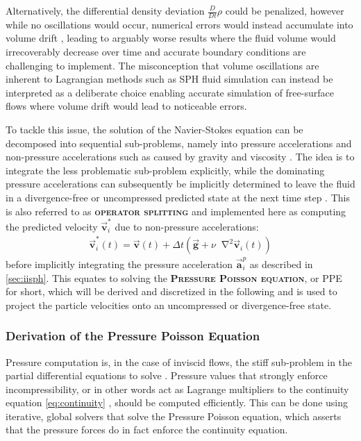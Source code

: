 \documentclass[oneside, a4paper]{book}
\newcommand\emphasis[1]{{\scshape\bfseries#1}}
\newcommand*\Laplace{\mathop{}\!\mathbin\nabla^2}
\newcommand\vek[1]{\vec{\bm{#1}}}
\newcommand\br[1]{\left(#1\right)}
\begin{document}
    Alternatively, the differential density deviation $\frac{D}{Dt}\rho$ could be penalized, however while no oscillations would occur, numerical errors would instead accumulate into volume drift \autocite{tutorial2019}, leading to arguably worse results where the fluid volume would irrecoverably decrease over time and accurate boundary conditions are challenging to implement. The misconception that volume oscillations are inherent to Lagrangian methods such as SPH fluid simulation can instead be interpreted as a deliberate choice enabling accurate simulation of free-surface flows where volume drift would lead to noticeable errors.
  
    To tackle this issue, the solution of the Navier-Stokes equation can be decomposed into sequential sub-problems, namely into pressure accelerations and non-pressure accelerations such as caused by gravity and viscosity \autocite{tutorial2019}. The idea is to integrate the less problematic sub-problem explicitly, while the dominating pressure accelerations can subsequently be implicitly determined to leave the fluid in a divergence-free or uncompressed predicted state at the next time step \autocite{tutorial2019}. This is also referred to as \emphasis{operator splitting} \autocite{tutorial2019} and implemented here as computing the predicted velocity $\vek{v}_i^*$ due to non-pressure accelerations:
    \begin{align}
      \vek{v}_i^*\br{t} = \vek{v}\br{t} + \Delta t\br{\vek{g} + \nu\Laplace\vek{v}_i\br{t}}\label{eq:operator-splitting}
    \end{align}
    before implicitly integrating the pressure acceleration $\vek{a}_i^p$ as described in \autoref{sec:iisph}. This equates to solving the \emphasis{Pressure Poisson equation}, or PPE for short, which will be derived and discretized in the following and is used to project the particle velocities onto an uncompressed or divergence-free state.

    \subsubsection{Derivation of the Pressure Poisson Equation}

    Pressure computation is, in the case of inviscid flows, the stiff sub-problem in the partial differential equations to solve \autocite{tutorial2019}. Pressure values that strongly enforce incompressibility, or in other words act as Lagrange multipliers to the continuity equation \autoref{eq:continuity} \autocite{tutorial2019}, should be computed efficiently. This can be done using iterative, global solvers that solve the Pressure Poisson equation, which asserts that the pressure forces do in fact enforce the continuity equation. 
    
\end{document}
